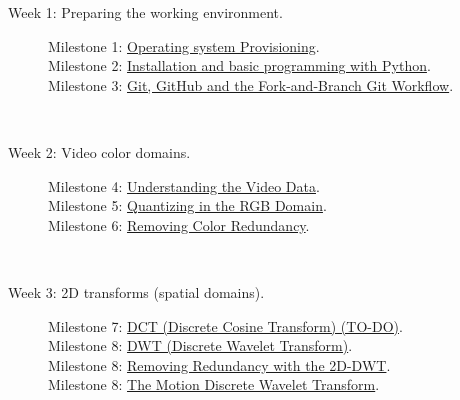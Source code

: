 \begin{description}
\item [Week 1: {\normalfont Preparing the working environment.}]
  \begin{description}
  \item [Milestone 1: {\normalfont \href{https://sistemas-multimedia.github.io/milestones/01-provisioning/}{Operating system Provisioning}.}]
  \item [Milestone 2: {\normalfont \href{https://sistemas-multimedia.github.io/milestones/02-python/}{Installation and basic programming with Python}.}]
  \item [Milestone 3: {\normalfont \href{https://sistemas-multimedia.github.io/milestones/03-git/}{Git, GitHub and the Fork-and-Branch Git Workflow}.}]
  \end{description}
  ~\newline
\item [Week 2: {\normalfont Video color domains.}]
  \begin{description}
  \item [Milestone 4: {\normalfont \href{https://sistemas-multimedia.github.io/milestones/04-the_data/}{Understanding the Video Data}.}]
  \item [Milestone 5: {\normalfont \href{https://sistemas-multimedia.github.io/milestones/05-quantization/}{Quantizing in the RGB Domain}.}]
  \item [Milestone 6: {\normalfont \href{https://sistemas-multimedia.github.io/milestones/06-color_transform/}{Removing Color Redundancy}.}] %
  \end{description}
  ~\newline
\item [Week 3: {\normalfont 2D transforms (spatial domains).}]
  \begin{description}
  \item [Milestone 7: {\normalfont \href{}{DCT (Discrete Cosine Transform) (TO-DO)}.}] %
  \item [Milestone 8: {\normalfont \href{https://sistemas-multimedia.github.io/milestones/07-DWT/}{DWT (Discrete Wavelet Transform)}.}] %
  \item [Milestone 8: {\normalfont \href{https://sistemas-multimedia.github.io/milestones/08-2D-DWT/}{Removing Redundancy with the 2D-DWT}.}] %
  \item [Milestone 8: {\normalfont \href{https://sistemas-multimedia.github.io/milestones/09-MDWT/}{The Motion Discrete Wavelet Transform}.}] %

\end{description}
\end{description}
